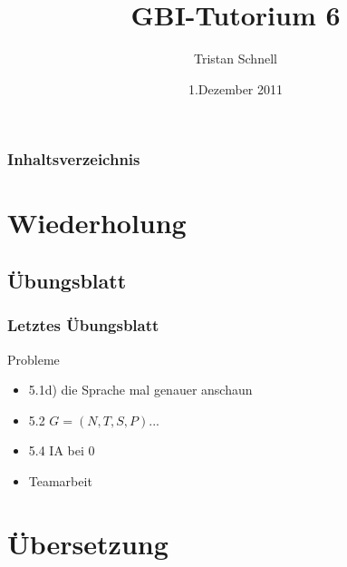 \documentclass{beamer}
\author{Tristan Schnell}
\title{GBI-Tutorium 6}
\date{1.Dezember 2011}
\begin{document}
\begin {frame}
	\titlepage
\end {frame}

\begin {frame}
	\frametitle {Inhaltsverzeichnis}
	\tableofcontents
\end {frame}

\section{Wiederholung}
\subsection{Übungsblatt}

\begin{frame}
	\frametitle{Letztes \"Ubungsblatt}
	\begin{block}{Probleme}
		\begin{itemize}
			\item 5.1d) die Sprache mal genauer anschaun
			\item 5.2 $G=(N,T,S,P)$...
			\item 5.4 IA bei 0
			\item Teamarbeit
		\end{itemize}
	\end{block}
\end{frame}

\section{Übersetzung}
\end{document}
